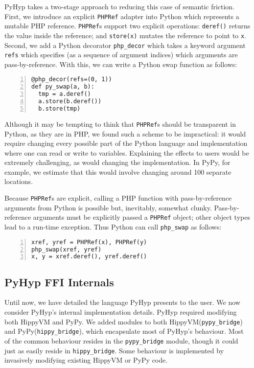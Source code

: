 \documentclass[a4paper,UKenglish]{lipics-v2016}
\newcommand{\ourvm}{PyHyp\xspace}
\newcommand{\hippy}{HippyVM\xspace}
\newcommand{\pypy}{PyPy\xspace}
\begin{document}
\label{php_decor}\label{phpref}
\ourvm takes a two-stage approach to reducing this case of semantic friction.
First, we introduce an explicit \texttt{PHPRef} adapter into
Python which represents a mutable PHP reference. \texttt{PHPRef}s support two explicit operations: \texttt{deref()}
returns the value inside the reference; and \texttt{store(x)} mutates the
reference to point to \texttt{x}. Second, we add a Python decorator
\texttt{php\_decor} which takes a keyword argument \texttt{refs} which specifies
(as a sequence of argument indices)
which arguments are pass-by-reference. With this, we can write a Python swap
function as follows:
\begin{lstlisting}[numbers=left]
@php_decor(refs=(0, 1))
def py_swap(a, b):
  tmp = a.deref()
  a.store(b.deref())
  b.store(tmp)
\end{lstlisting}
Although it may be tempting to think that \texttt{PHPRef}s should be transparent
in Python, as they are in PHP, we found such a scheme to be impractical: it
would require changing every possible part of the Python language and
implementation where one can read or write to variables. Explaining the
effects to users would be extremely challenging, as would changing the
implementation. In \pypy, for example, we estimate that this would involve changing
around 100 separate locations.

Because \texttt{PHPRef}s are explicit, calling a PHP function with
pass-by-reference arguments from Python is possible but, inevitably,
somewhat clunky. Pass-by-reference arguments must be explicitly passed a
\texttt{PHPRef} object; other object types lead to a run-time exception.
Thus Python can call \texttt{php\_swap} as follows:
\begin{lstlisting}[numbers=left]
xref, yref = PHPRef(x), PHPRef(y)
php_swap(xref, yref)
x, y = xref.deref(), yref.deref()
\end{lstlisting}


\subsection{\ourvm FFI Internals}
\label{sec:pyhyp_internals}

Until now, we have detailed the language \ourvm presents to the user.
We now consider \ourvm's internal implementation details.
\ourvm required modifying both \hippy and \pypy. We added
modules to both \hippy (\texttt{pypy\_bridge}) and \pypy (\texttt{hippy\_bridge}),
which encapsulate most of \ourvm's behaviour. Most of
the common behaviour resides in the \texttt{pypy\_bridge}  module, though it could just
as easily reside in \texttt{hippy\_bridge}. Some behaviour is implemented
by invasively modifying existing \hippy or \pypy code.
\end{document}
